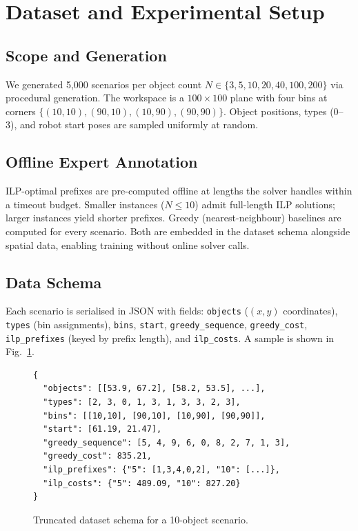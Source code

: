\documentclass[conference]{IEEEtran}
\begin{document}
\section{Dataset and Experimental Setup}\label{sec:data}

\subsection{Scope and Generation}

We generated 5{,}000 scenarios per object count $N \in \{3, 5, 10, 20, 40, 100, 200\}$ via procedural generation. The workspace is a $100 \times 100$ plane with four bins at corners $\{(10,10), (90,10), (10,90), (90,90)\}$. Object positions, types (0--3), and robot start poses are sampled uniformly at random.

\subsection{Offline Expert Annotation}

ILP-optimal prefixes are pre-computed offline at lengths the solver handles within a timeout budget. Smaller instances ($N{\le}10$) admit full-length ILP solutions; larger instances yield shorter prefixes. Greedy (nearest-neighbour) baselines are computed for every scenario. Both are embedded in the dataset schema alongside spatial data, enabling training without online solver calls.

\subsection{Data Schema}

Each scenario is serialised in JSON with fields: \texttt{objects} ($(x,y)$ coordinates), \texttt{types} (bin assignments), \texttt{bins}, \texttt{start}, \texttt{greedy\_sequence}, \texttt{greedy\_cost}, \texttt{ilp\_prefixes} (keyed by prefix length), and \texttt{ilp\_costs}. A sample is shown in Fig.~\ref{fig:json_sample}.

\begin{figure}[htbp]
\centering
\begin{scriptsize}
\begin{verbatim}
{
  "objects": [[53.9, 67.2], [58.2, 53.5], ...],
  "types": [2, 3, 0, 1, 3, 1, 3, 3, 2, 3],
  "bins": [[10,10], [90,10], [10,90], [90,90]],
  "start": [61.19, 21.47],
  "greedy_sequence": [5, 4, 9, 6, 0, 8, 2, 7, 1, 3],
  "greedy_cost": 835.21,
  "ilp_prefixes": {"5": [1,3,4,0,2], "10": [...]},
  "ilp_costs": {"5": 489.09, "10": 827.20}
}
\end{verbatim}
\end{scriptsize}
\caption{Truncated dataset schema for a 10-object scenario.}
\label{fig:json_sample}
\end{figure}
\end{document}

